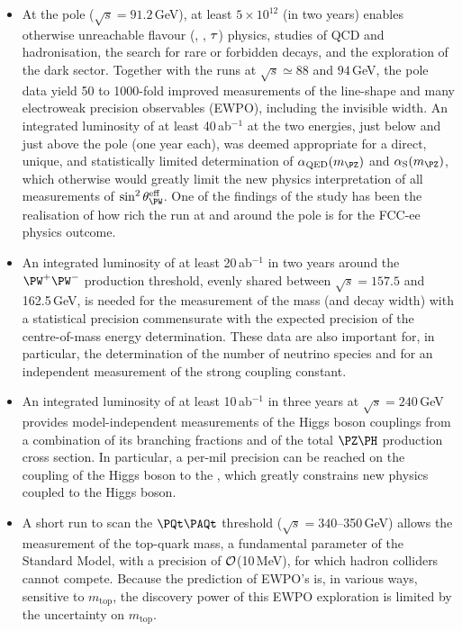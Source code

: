\begin{tcolorbox}[colback=blue!5!white,
                  colframe=blue!75!black,
                  title=Rationale for the operation model 
                 ]
\begin{itemize}
\item At the \PZ pole ($\sqrt{s} = 91.2$\,GeV), at least $5\times 10^{12}$ \PZ (in two years) enables otherwise unreachable flavour (\PQb, \PQc, $\mathrm{\tau}$) physics, studies of QCD and hadronisation, the search for rare or forbidden decays, and the exploration of the dark sector. 
Together with the runs at $\sqrt{s} \simeq 88$ and $94$\,GeV, the \PZ pole data yield 50 to 1000-fold improved measurements of the \PZ line-shape and many electroweak precision observables (EWPO), including the \PZ invisible width. 
An integrated luminosity of at least 40\,ab$^{-1} $ at the two energies, just below and just above the \PZ pole (one year each), was deemed appropriate for a direct, unique, and statistically limited determination of $\alpha_\text{QED}(m_{\PZ})$ and $\alpha_\mathrm{S}(m_{\PZ})$, 
which otherwise would greatly limit the new physics interpretation of all measurements of $\sin^2\theta_{\PW}^\text{eff}$. 
One of the findings of the study has been the realisation of how rich the run at and around the \PZ pole is for the FCC-ee physics outcome.
\item An integrated luminosity of at least 20\,ab$^{-1}$ in two years around the $\PW^+\PW^-$ production threshold, evenly shared between $\sqrt{s} = 157.5$ and 162.5\,GeV, is needed for the measurement of the \PW mass (and decay width) with a statistical precision commensurate with the expected precision of the centre-of-mass energy determination. 
These data are also important for, in particular, the determination of the number of neutrino species and for an independent measurement of the strong coupling constant.
\item An integrated luminosity of at least 10\,ab$^{-1}$ in three years at $\sqrt{s} = 240$\,GeV provides model-independent measurements of the Higgs boson couplings from a combination of its  branching fractions and of the total $\PZ\PH$ production cross section. 
In particular, a per-mil precision can be reached on the coupling of the Higgs boson to the \PZ, which greatly constrains new physics coupled to the Higgs boson.  
\item A short run to scan the $\PQt\PAQt$ threshold ($\sqrt{s} = 340$--350\,GeV) allows the measurement of the top-quark mass, a fundamental parameter of the Standard Model, with a precision of $\cal O$(10\,MeV), for which hadron colliders cannot compete. 
Because the prediction of EWPO's is, in various ways, sensitive to $m_\text{top}$, the discovery power of this EWPO exploration is limited by the uncertainty on $m_\text{top}$. 

\end{itemize}
\end{tcolorbox}
